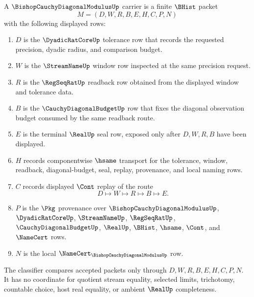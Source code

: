 \begin{definition}
\label{def:bishop-cauchy-diagonal-modulus-carrier}
A $\BishopCauchyDiagonalModulusUp$ carrier is a finite $\BHist$ packet
$$
M=(D,W,R,B,E,H,C,P,N)
$$
with the following displayed rows:
\begin{enumerate}
\item $D$ is the $\DyadicRatCoreUp$ tolerance row that records the requested precision, dyadic radius, and comparison budget.
\item $W$ is the $\StreamNameUp$ window row inspected at the same precision request.
\item $R$ is the $\RegSeqRatUp$ readback row obtained from the displayed window and tolerance data.
\item $B$ is the $\CauchyDiagonalBudgetUp$ row that fixes the diagonal observation budget consumed by the same readback route.
\item $E$ is the terminal $\RealUp$ seal row, exposed only after $D,W,R,B$ have been displayed.
\item $H$ records componentwise $\hsame$ transport for the tolerance, window, readback, diagonal-budget, seal, replay, provenance, and local naming rows.
\item $C$ records displayed $\Cont$ replay of the route
$$
D \longmapsto W \longmapsto R \longmapsto B \longmapsto E .
$$
\item $P$ is the $\Pkg$ provenance over $\BishopCauchyDiagonalModulusUp$, $\DyadicRatCoreUp$, $\StreamNameUp$, $\RegSeqRatUp$, $\CauchyDiagonalBudgetUp$, $\RealUp$, $\BHist$, $\hsame$, $\Cont$, and $\NameCert$ rows.
\item $N$ is the local $\NameCert_{\BishopCauchyDiagonalModulusUp}$ row.
\end{enumerate}
The classifier compares accepted packets only through $D,W,R,B,E,H,C,P,N$. It has no coordinate for quotient stream equality, selected limits, trichotomy, countable choice, host real equality, or ambient $\RealUp$ completeness.
\end{definition}

